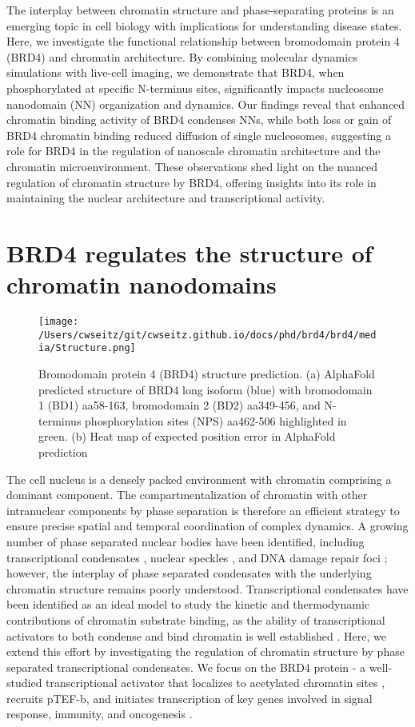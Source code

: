 The interplay between chromatin structure and phase-separating proteins is an emerging topic in cell biology with implications for understanding disease states. Here, we investigate the functional relationship between bromodomain protein 4 (BRD4) and chromatin architecture. By combining molecular dynamics simulations with live-cell imaging, we demonstrate that BRD4, when phosphorylated at specific N-terminus sites, significantly impacts nucleosome nanodomain (NN) organization and dynamics. Our findings reveal that enhanced chromatin binding activity of BRD4 condenses NNs, while both loss or gain of BRD4 chromatin binding reduced diffusion of single nucleosomes, suggesting a role for BRD4 in the regulation of nanoscale chromatin architecture and the chromatin microenvironment. These observations shed light on the nuanced regulation of chromatin structure by BRD4, offering insights into its role in maintaining the nuclear architecture and transcriptional activity.

\section{BRD4 regulates the structure of chromatin nanodomains}

\begin{figure}[t]
\centering
\texttt{[image: /Users/cwseitz/git/cwseitz.github.io/docs/phd/brd4/brd4/media/Structure.png]}
\caption{Bromodomain protein 4 (BRD4) structure prediction. (a) AlphaFold predicted structure of BRD4 long isoform (blue) with bromodomain 1 (BD1) aa58-163, bromodomain 2 (BD2) aa349-456, and N-terminus phosphorylation sites (NPS) aa462-506 highlighted in green. (b) Heat map of expected position error in AlphaFold prediction}
\end{figure}

The cell nucleus is a densely packed environment with chromatin comprising a dominant component. The compartmentalization of chromatin with other intranuclear components by phase separation is therefore an efficient strategy to ensure precise spatial and temporal coordination of complex dynamics. A growing number of phase separated nuclear bodies have been identified, including transcriptional condensates \parencite{Sabari2018,Hnisz2017}, nuclear speckles \parencite{Brown2008}, and DNA damage repair foci \parencite{Wang2023}; however, the interplay of phase separated condensates with the underlying chromatin structure remains poorly understood. Transcriptional condensates have been identified as an ideal model to study the kinetic and thermodynamic contributions of chromatin substrate binding, as the ability of transcriptional activators to both condense and bind chromatin is well established \parencite{Sabari2018,Wagh2021,Plys2018,Strom2024,Ma2021}. Here, we extend this effort by investigating the regulation of chromatin structure by phase separated transcriptional condensates. We focus on the BRD4 protein - a well-studied transcriptional activator that localizes to acetylated chromatin sites \parencite{Wu2018}, recruits pTEF-b, and initiates transcription of key genes involved in signal response, immunity, and oncogenesis \parencite{Itzen2014}.

